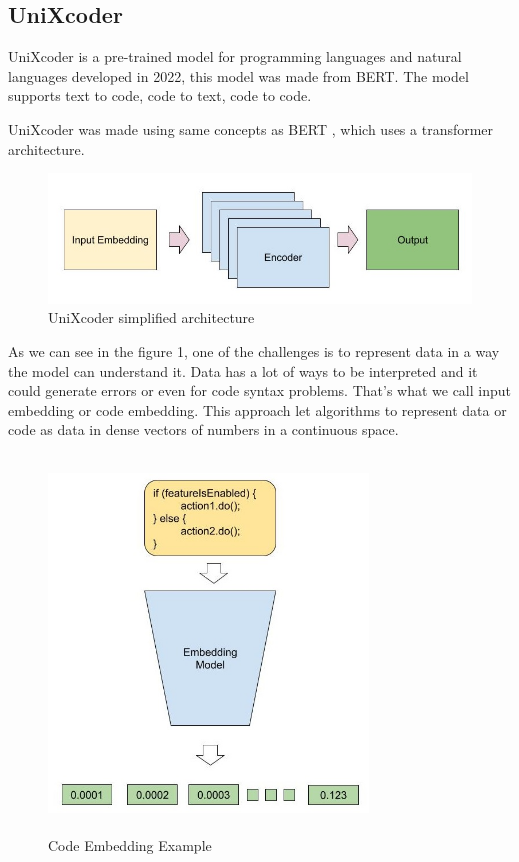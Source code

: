 \documentclass[conference]{IEEEtran}
\begin{document}
\subsection{UniXcoder}

UniXcoder is a pre-trained model for programming languages and natural languages developed in 2022, this model was made from BERT\cite{Devlin2019BERTPO}. 
The model supports text to code, code to text, code to code. 

UniXcoder was made using same concepts as BERT \cite{Devlin2019BERTPO}, which uses a transformer architecture. 

\begin{figure}[ht]
    \centering
    \includegraphics[scale=0.42]{./imgs/unixcoder-arc.jpg}
    \caption{UniXcoder simplified architecture}
\end{figure}

As we can see in the figure 1, one of the challenges is to represent data in a way the model can understand it.
Data has a lot of ways to be interpreted and it could generate errors or even for code syntax problems.
That's what we call input embedding or code embedding. This approach let algorithms to represent data or code as data in dense vectors of numbers in a continuous space.

\begin{figure}[ht]
    \centering
    \includegraphics[width=8.5cm, height=10cm]{./imgs/code-embedding.jpg}
    \caption{Code Embedding Example}
\end{figure}
\end{document}

